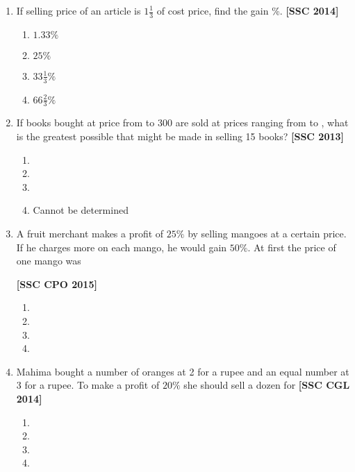 \documentclass[twocolumn]{article}
\begin{document}
\begin{enumerate}
        \item If selling price of an article is $1 \frac{1}{3}$ of cost price, find the gain \%. \hfill {\bf[SSC 2014]}
            \begin{enumerate}
                \item$1.33 \%$
                \item$25 \%$
                \item$33 \frac{1}{3} \%$
                \item$66 \frac{2}{3} \%$
            \end{enumerate}
        
        \item If books bought at price from  to 300 are sold at prices ranging from  to , what is the greatest possible that might be made in selling 15 books? \hfill {\bf[SSC 2013]}
            \begin{enumerate}
                \item {}
                \item {}
                \item {}
                \item Cannot be determined
            \end{enumerate}
            
        \item A fruit merchant makes a profit of $25 \%$ by selling mangoes at a certain price. If he charges  more on each mango, he would gain $50 \%$. At first the price of one mango was \\ \strut\hfill {\bf[SSC CPO 2015]}
            \begin{enumerate}
                \item {}
                \item {}
                \item {}
                \item {}
            \end{enumerate}
            
        \item Mahima bought a number of oranges at 2 for a rupee and an equal number at 3 for a rupee. To make a profit of $20 \%$ she should sell a dozen for \hfill {\bf[SSC CGL 2014]}
            \begin{enumerate}
                \item {}
                \item {}
                \item {}
                \item {}
            \end{enumerate}
        

\end{enumerate}
\end{document}
